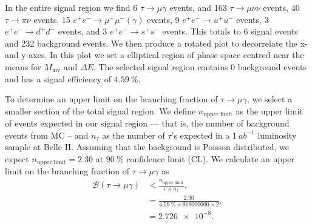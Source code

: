 \documentclass[12pt]{thesis}  %
\begin{document}
In the entire signal region we find 6 $\tau\to\mu\gamma$ events, and 163 $\tau\to\mu\nu\nu$ events, 40 $\tau\to\pi\nu$ events, 15 $e^+ e^-\to\mu^+\mu^-(\gamma)$ events, 9 $e^+ e^-\to u^+ u^-$ events, 3 $e^+ e^-\to d^+ d^-$ events, and 3 $e^+ e^-\to s^+ s^-$ events. This totals to 6 signal events and \num{232} background events. We then produce a rotated plot to decorrelate the x- and y-axes. In this plot we set a elliptical region of phase space centred near the means for $M_{\text{inv}}$ and $\Delta E$. The selected signal region contains 0 background events and has a signal efficiency of $\SI{4.59}{\percent}$.

To determine an upper limit on the branching fraction of $\tau\to\mu\gamma$, we select a smaller section of the total signal region. We define $n_{\text{upper limit}}$ as the upper limit of events expected in our signal region --- that is, the number of background events from MC -- and $n_{\tau}$ as the number of $\tau$'s expected in a $\SI{1}{ab^{-1}}$ luminosity sample at Belle II. Assuming that the background is Poisson distributed, we expect $n_{\text{upper limit}}=2.30$ at $\SI{90}{\percent}$ confidence limit (CL). We calculate an upper limit on the branching fraction of $\tau\to\mu\gamma$ as
\begin{align}
\mathcal{B}(\tau\to\mu\gamma) &< \frac{n_{\text{upper limit}}}{\epsilon\times n_{\tau}},\\
&=\frac{2.30}{\SI{4.59}{\percent}\times \num{919000000}\times 2},\\
&= \num{2.726e-8}.
\end{align}
\end{document}
